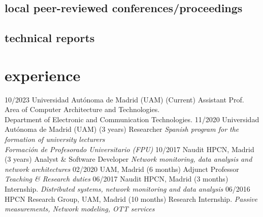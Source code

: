 \documentclass[]{friggeri-cv}
\begin{document}
\subsection{local peer-reviewed conferences/proceedings}
\begin{refsegment}
  \nocite{*}
  \printbibliography[sorting=chronological, type=inproceedings, keyword={spanish}, heading=none]
\end{refsegment}
\subsection{technical reports}
\begin{refsegment}
  \nocite{*}
  \printbibliography[sorting=chronological, type=report, heading=none]
\end{refsegment}

\section{experience}

\begin{entrylist}
\entry
    {10/2023}
    {Universidad Autónoma de Madrid (UAM) \hspace{1em} (Current) }
    {Assistant Prof.}
    {Area of Computer Architecture and Technologies. \\
    Department of Electronic and Communication Technologies.
    }
\entry
    {11/2020}
    {Universidad Autónoma de Madrid (UAM) \hspace{1em} (3 years) }
    {Researcher}
    {\emph{Spanish program for the formation of university lecturers \\
    Formación de Profesorado Universitario (FPU)}}
  \entry
    {10/2017}
    {Naudit HPCN, Madrid \hspace{1em} (3 years) }
    {Analyst \& Software Developer}
    {\emph{Network monitoring, data analysis and network architectures}}
\entry
    {02/2020}
    {UAM, Madrid \hspace{1em} (6 months) }
    {Adjunct Professor}
    {\emph{Teaching \& Research duties}}
\entry
    {06/2017}
    {Naudit HPCN, Madrid \hspace{1em} (3 months)}
    {Internship.}
    {\emph{Distributed systems, network monitoring and data analysis}}
    \entry
    {06/2016}
    {HPCN Research Group, UAM, Madrid \hspace{1em} (10 months) }
    {Research Internship.}
    {\emph{Passive measurements, Network modeling, OTT services}}{}
 
\end{entrylist}
\newpage
\end{document}
